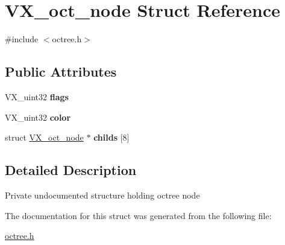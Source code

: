 \hypertarget{structVX__oct__node}{\section{V\-X\-\_\-oct\-\_\-node Struct Reference}
\label{structVX__oct__node}
}


{\ttfamily \#include $<$octree.\-h$>$}

\subsection*{Public Attributes}
\begin{DoxyCompactItemize}
\item 
\hypertarget{structVX__oct__node_ade1d9afce2d27cdd645aead11be992b8}{V\-X\-\_\-uint32 {\bfseries flags}}\label{structVX__oct__node_ade1d9afce2d27cdd645aead11be992b8}

\item 
\hypertarget{structVX__oct__node_a8e05b1504f8551f904d8da7b7b86c767}{V\-X\-\_\-uint32 {\bfseries color}}\label{structVX__oct__node_a8e05b1504f8551f904d8da7b7b86c767}

\item 
\hypertarget{structVX__oct__node_a965ee9c3e76a04cf4478d15aae77bd86}{struct \hyperlink{structVX__oct__node}{V\-X\-\_\-oct\-\_\-node} $\ast$ {\bfseries childs} \mbox{[}8\mbox{]}}\label{structVX__oct__node_a965ee9c3e76a04cf4478d15aae77bd86}

\end{DoxyCompactItemize}


\subsection{Detailed Description}
Private undocumented structure holding octree node 

The documentation for this struct was generated from the following file\-:\begin{DoxyCompactItemize}
\item 
\hyperlink{octree_8h}{octree.\-h}\end{DoxyCompactItemize}
